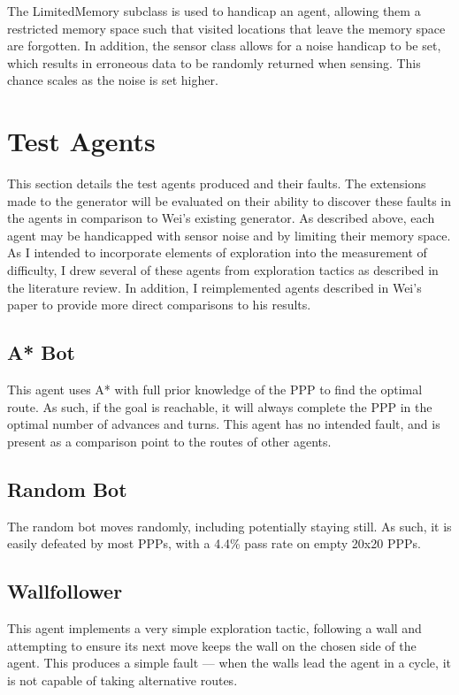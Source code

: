 \documentclass[authoryearcitations]{UoYCSproject}
\begin{document}
The LimitedMemory subclass is used to handicap an agent, allowing them a restricted memory space such that visited locations that leave the memory space are forgotten. In addition, the sensor class allows for a noise handicap to be set, which results in erroneous data to be randomly returned when sensing. This chance scales as the noise is set higher.

\section{Test Agents}
\label{sec:da_5}
This section details the test agents produced and their faults. The extensions made to the generator will be evaluated on their ability to discover these faults in the agents in comparison to Wei's existing generator. As described above, each agent may be handicapped with sensor noise and by limiting their memory space. As I intended to incorporate elements of exploration into the measurement of difficulty, I drew several of these agents from exploration tactics as described in the literature review. In addition, I reimplemented agents described in Wei's paper to provide more direct comparisons to his results.

\subsection{A* Bot}
\label{sec:da_5_1}
This agent uses A* with full prior knowledge of the PPP to find the optimal route. As such, if the goal is reachable, it will always complete the PPP in the optimal number of advances and turns. This agent has no intended fault, and is present as a comparison point to the routes of other agents.

\subsection{Random Bot}
\label{sec:da_5_2}
The random bot moves randomly, including potentially staying still. As such, it is easily defeated by most PPPs, with a 4.4\% pass rate on empty 20x20 PPPs.

\subsection{Wallfollower}
\label{sec:da_5_3}
This agent implements a very simple exploration tactic, following a wall and attempting to ensure its next move keeps the wall on the chosen side of the agent. This produces a simple fault --- when the walls lead the agent in a cycle, it is not capable of taking alternative routes.
\end{document}
